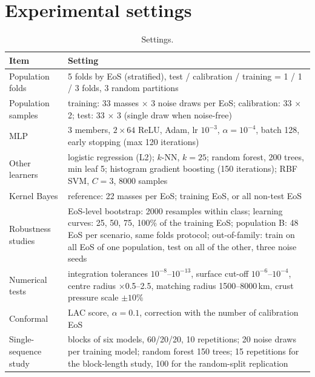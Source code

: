 \documentclass[11pt,a4paper]{article}
\begin{document}
\section{Experimental settings}
\begin{table}[H]\centering\small\caption{Settings.}
\begin{tabular}{p{}p{}}\toprule
Item & Setting\\\midrule
Population folds & 5 folds by EoS (stratified), test / calibration / training = 1 / 1 / 3 folds, 3 random partitions\\
Population samples & training: 33 masses $\times$ 3 noise draws per EoS; calibration: 33 $\times$ 2; test: 33 $\times$ 3 (single draw when noise-free)\\
MLP & 3 members, $2\times64$ ReLU, Adam, lr $10^{-3}$, $\alpha=10^{-4}$, batch 128, early stopping (max 120 iterations)\\
Other learners & logistic regression (L2); $k$-NN, $k=25$; random forest, 200 trees, min leaf 5; histogram gradient boosting (150 iterations); RBF SVM, $C=3$, 8000 samples\\
Kernel Bayes & reference: 22 masses per EoS; training EoS, or all non-test EoS\\
Robustness studies & EoS-level bootstrap: 2000 resamples within class; learning curves: 25, 50, 75, 100\% of the training EoS; population B: 48 EoS per scenario, same folds protocol; out-of-family: train on all EoS of one population, test on all of the other, three noise seeds\\
Numerical tests & integration tolerances $10^{-8}$--$10^{-13}$, surface cut-off $10^{-6}$--$10^{-4}$, centre radius $\times$0.5--2.5, matching radius 1500--8000\,km, crust pressure scale $\pm10\%$\\
Conformal & LAC score, $\alpha=0.1$, correction with the number of calibration EoS\\
Single-sequence study & blocks of six models, 60/20/20, 10 repetitions; 20 noise draws per training model; random forest 150 trees; 15 repetitions for the block-length study, 100 for the random-split replication\\\bottomrule\end{tabular}\end{table}
\end{document}
